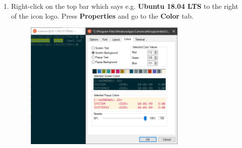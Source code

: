 \begin{enumerate}[a)]
\begin{enumerate}[1.]
        \item Right-click on the top bar which says e.g. \textbf{Ubuntu 18.04 LTS} to the right of the icon logo. Press \textbf{Properties} and go to the \textbf{Color} tab.
        \begin{figure}[H]
            \centering
            \includegraphics[width=0.75\textwidth]{tex/WSL/Ubuntu_terminal_colors/Figures/1.PNG}
        \end{figure}
        

\end{enumerate}
\end{enumerate}
